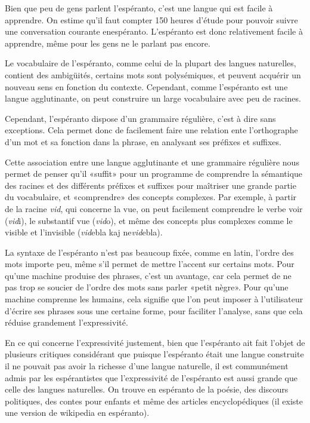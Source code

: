 \documentclass[french,a4paper]{article}
\begin{document}
Bien que peu de gens parlent l'espéranto, c'est une langue qui est
facile à apprendre. On estime qu'il faut compter 150 heures d'étude
pour pouvoir suivre une conversation courante enespéranto. L'espéranto
est donc relativement facile à apprendre, même pour les gens ne le
parlant pas encore.

Le vocabulaire de l'espéranto, comme celui de la plupart des langues
naturelles, contient des ambigüités, certains mots sont polysémiques,
et peuvent acquérir un nouveau sens en fonction du
contexte. Cependant, comme l'espéranto est une langue agglutinante, on
peut construire un large vocabulaire avec peu de racines. 

Cependant, l'espéranto dispose d'un grammaire régulière, c'est à dire
sans exceptions. Cela permet donc de facilement faire une relation
ente l'orthographe d'un mot et sa fonction dans la phrase, en
analysant ses préfixes et suffixes.

Cette association entre une langue agglutinante et une grammaire
régulière nous permet de penser qu'il «suffit» pour un programme de
comprendre la sémantique des racines et des différents préfixes et
suffixes pour maîtriser une grande partie du vocabulaire, et
«comprendre» des concepts complexes. Par exemple, à partir de la
racine \emph{vid}, qui concerne la vue, on peut facilement comprendre
le verbe voir (\emph{vid}i), le substantif vue (\emph{vid}o), et même
des concepts plus complexes comme le visible et l'invisible
(\emph{vid}ebla kaj ne\emph{vid}ebla).

La syntaxe de l'espéranto n'est pas beaucoup fixée, comme en latin,
l'ordre des mots importe peu, même s'il permet de mettre l'accent sur
certains mots. Pour qu'une machine produise des phrases, c'est un
avantage, car cela permet de ne pas trop se soucier de l'ordre des
mots sans parler «petit nègre». Pour qu'une machine comprenne les
humains, cela signifie que l'on peut imposer à l'utilisateur d'écrire
ses phrases sous une certaine forme, pour faciliter l'analyse, sans
que cela réduise grandement l'expressivité.

En ce qui concerne l'expressivité justement, bien que l'espéranto ait
fait l'objet de plusieurs critiques considérant que puisque
l'espéranto était une langue construite il ne pouvait pas avoir la
richesse d'une langue naturelle, il est communément admis par les
espérantistes que l'expressivité de l'espéranto est aussi grande que
celle des langues naturelles. On trouve en espéranto de la poésie, des
discours politiques, des contes pour enfants et même des articles
encyclopédiques (il existe une version de wikipedia en espéranto).
\end{document}
